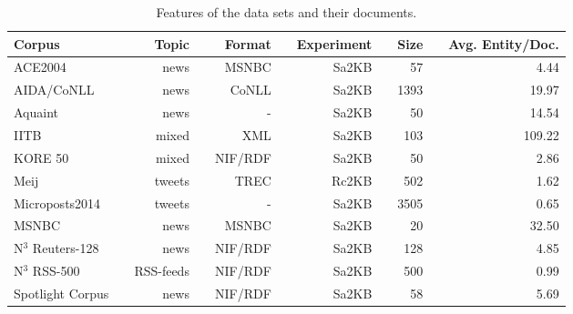 \begin{table}
    \caption{Features of the data sets and their documents.}
    \begin{tabular}{lp{0.25cm}rp{0.25cm}rp{0.25cm}rp{0.25cm}rp{0.25cm}r}
     \toprule
     Corpus && Topic &&Format &&Experiment && \multicolumn{1}{c}{Size} && \multicolumn{1}{c}{Avg. Entity/Doc.} \\
    \midrule
ACE2004          && news        && MSNBC    && Sa2KB    &&   57 &&   4.44\\
AIDA/CoNLL       && news        && CoNLL    && Sa2KB    && 1393 &&  19.97\\
Aquaint          && news        &&  -       && Sa2KB    &&   50 &&  14.54\\
IITB             && mixed       && XML      && Sa2KB    &&  103 && 109.22\\
KORE 50          && mixed       && NIF/RDF  && Sa2KB    &&   50 &&   2.86\\
Meij             && tweets      && TREC     && Rc2KB    &&  502 &&   1.62\\
Microposts2014   && tweets      &&  -       && Sa2KB    && 3505 &&   0.65\\
MSNBC            && news        && MSNBC    && Sa2KB    &&   20 &&  32.50\\
N$^3$ Reuters-128&& news        && NIF/RDF  && Sa2KB    &&  128 &&   4.85\\
N$^3$ RSS-500    && RSS-feeds   && NIF/RDF  && Sa2KB    &&  500 &&   0.99\\
Spotlight Corpus && news        && NIF/RDF  && Sa2KB    &&   58 &&   5.69\\
	\bottomrule
	\end{tabular}
	\centering
	\label{cha333:tab:corpus_stats}
\end{table}


